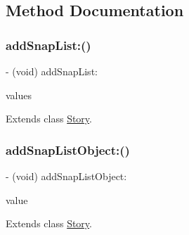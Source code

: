 \subsection{Method Documentation}
\hypertarget{category_story_07_core_data_generated_accessors_08_a3464007fbbd05bb5bd748f811a83e103}{}\label{category_story_07_core_data_generated_accessors_08_a3464007fbbd05bb5bd748f811a83e103} 
\subsubsection{\texorpdfstring{add\+Snap\+List\+:()}{addSnapList:()}}
{\footnotesize\ttfamily -\/ (void) add\+Snap\+List\+: \begin{DoxyParamCaption}\item[{(N\+S\+Ordered\+Set$<$ \hyperlink{interface_snap}{Snap} $\ast$ $>$ $\ast$)}]{values }\end{DoxyParamCaption}}



Extends class \hyperlink{interface_story_a3464007fbbd05bb5bd748f811a83e103}{Story}.

\hypertarget{category_story_07_core_data_generated_accessors_08_a34b377739386181624777fb994e5b02e}{}\label{category_story_07_core_data_generated_accessors_08_a34b377739386181624777fb994e5b02e} 
\subsubsection{\texorpdfstring{add\+Snap\+List\+Object\+:()}{addSnapListObject:()}}
{\footnotesize\ttfamily -\/ (void) add\+Snap\+List\+Object\+: \begin{DoxyParamCaption}\item[{(\hyperlink{interface_snap}{Snap} $\ast$)}]{value }\end{DoxyParamCaption}}



Extends class \hyperlink{interface_story_a34b377739386181624777fb994e5b02e}{Story}.


